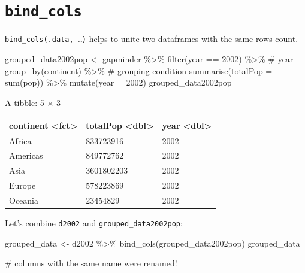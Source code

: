 \documentclass[
  letterpaper,
  DIV=11,
  numbers=noendperiod]{scrreprt}
\newenvironment{Shaded}{\begin{snugshade}}{\end{snugshade}}
\newcommand{\AttributeTok}[1]{\textcolor[rgb]{0.40,0.45,0.13}{#1}}
\newcommand{\CommentTok}[1]{\textcolor[rgb]{0.37,0.37,0.37}{#1}}
\newcommand{\DecValTok}[1]{\textcolor[rgb]{0.68,0.00,0.00}{#1}}
\newcommand{\FunctionTok}[1]{\textcolor[rgb]{0.28,0.35,0.67}{#1}}
\newcommand{\NormalTok}[1]{\textcolor[rgb]{0.00,0.23,0.31}{#1}}
\newcommand{\OtherTok}[1]{\textcolor[rgb]{0.00,0.23,0.31}{#1}}
\newcommand{\SpecialCharTok}[1]{\textcolor[rgb]{0.37,0.37,0.37}{#1}}
\begin{document}
\section{\texorpdfstring{\texttt{bind\_cols}}{bind\_cols}}\label{bind_cols}

\texttt{bind\_cols(.data,\ …)} helps to unite two dataframes with the
same rows count.

\begin{Shaded}
\begin{Highlighting}[]
\NormalTok{grouped\_data2002pop }\OtherTok{\textless{}{-}}\NormalTok{ gapminder }\SpecialCharTok{\%\textgreater{}\%}
    \FunctionTok{filter}\NormalTok{(year }\SpecialCharTok{==} \DecValTok{2002}\NormalTok{) }\SpecialCharTok{\%\textgreater{}\%} \CommentTok{\# year}
    \FunctionTok{group\_by}\NormalTok{(continent) }\SpecialCharTok{\%\textgreater{}\%} \CommentTok{\# grouping condition}
    \FunctionTok{summarise}\NormalTok{(}\AttributeTok{totalPop =} \FunctionTok{sum}\NormalTok{(pop)) }\SpecialCharTok{\%\textgreater{}\%}
    \FunctionTok{mutate}\NormalTok{(}\AttributeTok{year =} \DecValTok{2002}\NormalTok{)}
\NormalTok{grouped\_data2002pop}
\end{Highlighting}
\end{Shaded}

A tibble: 5 × 3

\begin{longtable}[]{@{}lll@{}}
\toprule\noalign{}
continent \textless fct\textgreater{} & totalPop
\textless dbl\textgreater{} & year \textless dbl\textgreater{} \\
\midrule\noalign{}
\endhead
\bottomrule\noalign{}
\endlastfoot
Africa & 833723916 & 2002 \\
Americas & 849772762 & 2002 \\
Asia & 3601802203 & 2002 \\
Europe & 578223869 & 2002 \\
Oceania & 23454829 & 2002 \\
\end{longtable}

Let's combine \texttt{d2002} and \texttt{grouped\_data2002pop}:

\begin{Shaded}
\begin{Highlighting}[]
\NormalTok{grouped\_data }\OtherTok{\textless{}{-}}\NormalTok{ d2002 }\SpecialCharTok{\%\textgreater{}\%} 
    \FunctionTok{bind\_cols}\NormalTok{(grouped\_data2002pop)}
\NormalTok{grouped\_data}

\CommentTok{\# columns with the same name were renamed!}
\end{Highlighting}
\end{Shaded}
\end{document}
